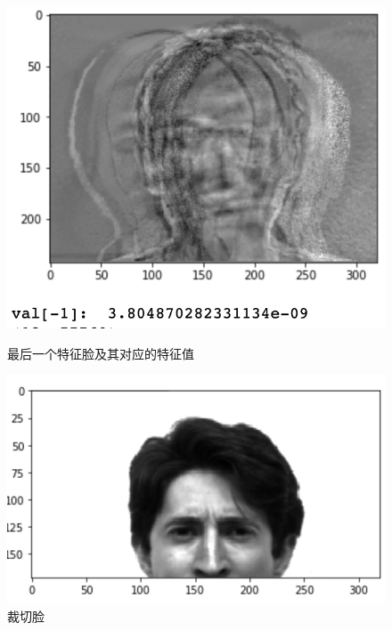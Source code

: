 \documentclass{ctexart}
\begin{document}
\begin{figure}[htbp]
    \begin{minipage}[t]{0.45 \linewidth}
        \centering
        \includegraphics[scale=0.45]{imgs/not-full-rank.png}
        \caption{最后一个特征脸及其对应的特征值}
        \label{not-full-rank}
    \end{minipage}
    \begin{minipage}[t]{0.45 \linewidth}
        \centering
        \includegraphics[scale=0.45]{imgs/semi_face.png}
        \caption{裁切脸}
        \label{cropface}
    \end{minipage}
\end{figure}
\end{document}
